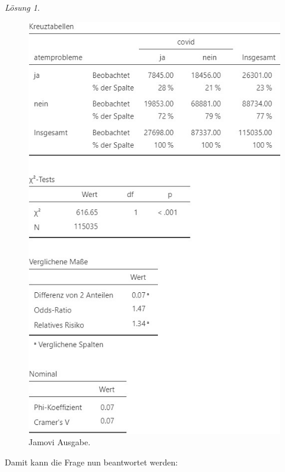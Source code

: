 \documentclass[
]{book}
\theoremstyle{definition}
\theoremstyle{definition}
\theoremstyle{definition}
\theoremstyle{definition}
\theoremstyle{remark}
\newtheorem*{solution}{Lösung}
\begin{document}
\begin{solution}
\begin{figure}
{\centering \includegraphics{figures/09-exr-covid-atemnot-jmv-output} 

}

\caption{Jamovi Ausgabe.}\label{fig:sol-covid-atemnot-output}
\end{figure}

Damit kann die Frage nun beantwortet werden:


\end{solution}
\end{document}

